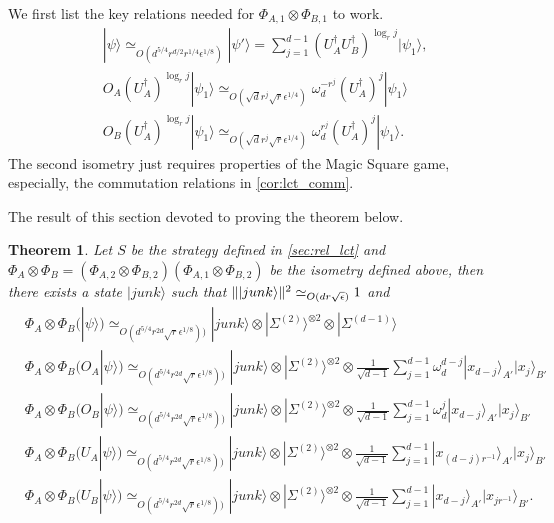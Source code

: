 \documentclass[11pt,letterpaper]{article}
\newcommand{\ket}[1]{|#1\rangle}
\newcommand{\x}{\otimes}
\newcommand{\ct}{^{\dagger}}
\DeclarePairedDelimiter{\norm}{\lVert}{\rVert}
\newcommand{\1}{\mathbb{1}}
\newcommand{\EPR}[1]{\Sigma^{(#1)}}
\newcommand{\ep}{\epsilon}
\newcommand{\se}{\sqrt{\epsilon}}
\newcommand{\qe}{\epsilon^{1/4}}
\newcommand{\sd}{\sqrt{d}}
\newcommand{\sr}{\sqrt{r}}
\newcommand{\appd}[1]{\simeq_{#1}}
\newtheorem{theorem}{Theorem}
\theoremstyle{definition}
\begin{document}
We first list the key relations needed for $\Phi_{A,1} \x \Phi_{B,1}$ to work.
\begin{align}
	&\ket{\psi} \appd{O(d^{5/4} r^{d/2} r^{1/4} \ep^{1/8})}\ket{\psi'} = \sum_{j=1}^{d-1} (U_A\ct U_B\ct)^{\log_r j} \ket{\psi_1},\\
	&O_A(U_A\ct)^{\log_r j} \ket{\psi_1} \appd{O(\sd r^j \sr \qe)}\omega_d^{-r^j}  (U_A\ct)^j \ket{\psi_1}\\
	&O_B(U_A\ct)^{\log_r j} \ket{\psi_1} \appd{O(\sd r^j \sr \qe)}\omega_d^{r^j}  (U_A\ct)^j \ket{\psi_1}.
\end{align}
The second isometry just requires properties of the Magic Square game, especially, the commutation relations in \cref{cor:lct_comm}.

The result of this section devoted to proving the theorem below.
\begin{theorem}
	Let $S$ be the strategy defined in \cref{sec:rel_lct} and  
	$\Phi_A \x \Phi_B = (\Phi_{A,2} \x \Phi_{B,2})(\Phi_{A,1}\x\Phi_{B,2})$ be the isometry defined above, then there exists a state $\ket{junk}$
	such that $\norm{\ket{junk}}^2 \appd{O(dr\se)} 1$ and 
	\begin{align}
		&\Phi_A \x \Phi_B (\ket{\psi}) \appd{O(d^{5/4} r^{2d} \sr \ep^{1/8}))} \ket{junk} \x \ket{\EPR{2}}^{\x 2} \x \ket{\EPR{d-1}}\\	
		&\Phi_A \x \Phi_B (O_A\ket{\psi}) \appd{O(d^{5/4} r^{2d}\sr \ep^{1/8}))} \ket{junk} \x \ket{\EPR{2}}^{\x 2} \x
		\frac{1}{\sqrt{d-1}}\sum_{j=1}^{d-1} \omega_d^{d-j}\ket{x_{d-j}}_{A'}\ket{x_j}_{B'} \\
		&\Phi_A \x \Phi_B (O_B\ket{\psi}) \appd{O(d^{5/4}r^{2d}\sr \ep^{1/8}))} \ket{junk} \x \ket{\EPR{2}}^{\x 2} \x
		\frac{1}{\sqrt{d-1}}\sum_{j=1}^{d-1} \omega_d^{j}\ket{x_{d-j}}_{A'}\ket{x_j}_{B'}\\
		&\Phi_A \x \Phi_B (U_A\ket{\psi}) \appd{O(d^{5/4} r^{2d} \sr \ep^{1/8}))} \ket{junk} \x \ket{\EPR{2}}^{\x 2} \x
		\frac{1}{\sqrt{d-1}}\sum_{j=1}^{d-1} \ket{x_{(d-j)r^{-1}}}_{A'}\ket{x_j}_{B'} \\
		&\Phi_A \x \Phi_B (U_B\ket{\psi}) \appd{O(d^{5/4} r^{2d}\sr \ep^{1/8}))} \ket{junk} \x \ket{\EPR{2}}^{\x 2} \x
		\frac{1}{\sqrt{d-1}}\sum_{j=1}^{d-1} \ket{x_{d-j}}_{A'}\ket{x_{j r^{-1}}}_{B'}.
	\end{align}
\end{theorem}
\end{document}
